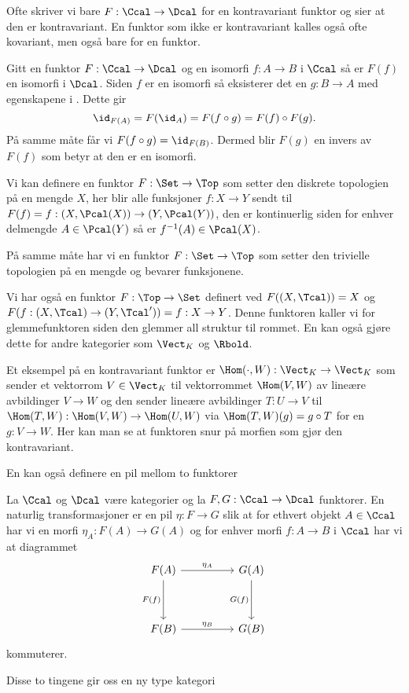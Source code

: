 Ofte skriver vi bare $F:\Ccal\to\Dcal$ for en kontravariant
funktor og sier at den er kontravariant. En funktor som ikke er
kontravariant kalles også ofte kovariant, men også bare for en
funktor.

\begin{remark}\label{Rem:FunktorIso}
    Gitt en funktor $F:\Ccal\to\Dcal$ og en isomorfi $f:A\to B$ i $\Ccal$ så er $F(f)$ en isomorfi i $\Dcal$. Siden $f$ er en isomorfi så eksisterer det en $g: B\to A$ med egenskapene i . Dette gir 
    \[\id_{F(A)} = F(\id_A) = F(f\circ g) = F(f)\circ F(g).\]
    På samme måte får vi $F(f\circ g) = \id_{F(B)}$. Dermed blir $F(g)$ en invers av $F(f)$ som betyr at den er en isomorfi.
\end{remark}

\begin{example}\label{Ex:DiskFunkt}
    Vi kan definere en funktor $F:\Set\to\Top$ som setter den diskrete topologien på en mengde $X$, her blir alle funksjoner $f: X\to Y$ sendt til $F(f)=f:(X,\Pcal(X))\to (Y,\Pcal(Y))$, den er kontinuerlig siden for enhver delmengde $A\in \Pcal(Y)$ så er $f^{-1}(A)\in\Pcal(X)$.
\end{example}
På samme måte har vi en funktor $F:\Set\to\Top$ som setter den trivielle topologien på en mengde og bevarer funksjonene.

\begin{example}\label{Ex:Glemmefunktor}
    Vi har også en funktor $F:\Top\to\Set$ definert ved $F((X,\Tcal)) = X$ og $F(f:(X,\Tcal)\to (Y,\Tcal')) = f: X\to Y$. Denne funktoren kaller vi for glemmefunktoren siden den glemmer all struktur til rommet. En kan også gjøre dette for andre kategorier som $\Vect_K$ og $\Rbold$.
\end{example}

\begin{example}\label{ex:Homfunkt}
  Et eksempel på en kontravariant funktor er
  $\Hom(\cdot,W):\Vect_K\to\Vect_K$ som sender et vektorrom
  $V\in\Vect_K$ til vektorrommet $\Hom(V,W)$ av lineære
  avbildinger $V\to W$ og den sender lineære avbildinger $T:U\to
  V$ til $\Hom(T,W):\Hom(V,W)\to\Hom(U,W)$ via
  $\Hom(T,W)(g)=g\circ T$ for en $g:V\to W$. Her kan man se at
  funktoren snur på morfien som gjør den kontravariant.
\end{example}

En kan også definere en pil mellom to funktorer
\begin{definition}\label{Def:label}
    La $\Ccal$ og $\Dcal$ være kategorier og la $F,G: \Ccal\to\Dcal$ funktorer. En naturlig transformasjoner er en pil $\eta: F\to G$ slik at for ethvert objekt $A\in \Ccal$ har vi en morfi $\eta_A: F(A)\to G(A)$ og for enhver morfi $f: A\to B$ i $\Ccal$ har vi at diagrammet
    \[\begin{tikzcd}
	{F(A)} && {G(A)} \\
	\\
	{F(B)} && {G(B)}
	\arrow["{\eta_A}", from=1-1, to=1-3]
	\arrow["{F(f)}"', from=1-1, to=3-1]
	\arrow["{G(f)}"', from=1-3, to=3-3]
	\arrow["{\eta_B}", from=3-1, to=3-3]
\end{tikzcd}\]
kommuterer.
\end{definition}
Disse to tingene gir oss en ny type kategori

